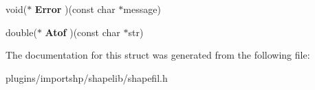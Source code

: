 \begin{DoxyCompactItemize}
\item 
\hypertarget{structSAHooks_a094b75a664448b1e9ba0090e3d2d5982}{void($\ast$ {\bfseries Error} )(const char $\ast$message)}\label{structSAHooks_a094b75a664448b1e9ba0090e3d2d5982}

\item 
\hypertarget{structSAHooks_a019c01ef46e511591af5b551bb3975ab}{double($\ast$ {\bfseries Atof} )(const char $\ast$str)}\label{structSAHooks_a019c01ef46e511591af5b551bb3975ab}

\end{DoxyCompactItemize}


The documentation for this struct was generated from the following file\-:\begin{DoxyCompactItemize}
\item 
plugins/importshp/shapelib/shapefil.\-h\end{DoxyCompactItemize}
